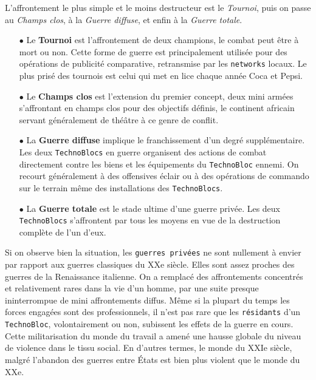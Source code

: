 \documentclass[11pt,twoside,a4paper]{article}
\begin{document}
\begin{multicols*}{2}
L'affrontement le plus simple et le moins destructeur est le \emph{Tournoi}, puis on passe au \emph{Champs clos}, {\`a} la \emph{Guerre diffuse}, et enfin {\`a} la \emph{Guerre totale}. %
\begin{itemize}
	\small
	\item[$\bullet$] Le \textbf{Tournoi} est l'affrontement de deux champions, le combat peut {\^e}tre {\`a} mort ou non. Cette forme de guerre est principalement utilis{\'e}e pour des op{\'e}rations de publicit{\'e} comparative, retransmise par les \texttt{networks} locaux. Le plus pris{\'e} des tournois est celui qui met en lice chaque ann{\'e}e Coca et Pepsi.
	\item[$\bullet$] Le \textbf{Champs clos} est l'extension du premier concept, deux mini arm{\'e}es s'affrontant en champs clos pour des objectifs d{\'e}finis, le continent africain servant g{\'e}n{\'e}ralement de th{\'e}{\^a}tre {\`a} ce genre de conflit.
	\item[$\bullet$] La \textbf{Guerre diffuse} implique le franchissement d'un degr{\'e} suppl{\'e}mentaire. Les deux \texttt{TechnoBlocs} en guerre organisent des actions de combat directement contre les biens et les {\'e}quipements du \texttt{TechnoBloc} ennemi. On recourt g{\'e}n{\'e}ralement {\`a} des offensives {\'e}clair ou {\`a} des op{\'e}rations de commando sur le terrain m{\^e}me des installations des \texttt{TechnoBlocs}.
	\item[$\bullet$] La \textbf{Guerre totale} est le stade ultime d'une guerre priv{\'e}e. Les deux \texttt{TechnoBlocs} s'affrontent par tous les moyens en vue de la destruction compl{\`e}te de l'un d'eux.
\end{itemize} %
	
Si on observe bien la situation, les \texttt{guerres priv{\'e}es} ne sont nullement {\`a} envier par rapport aux guerres classiques du XXe si{\`e}cle. Elles sont assez proches des guerres de la Renaissance italienne. On a remplac{\'e} des affrontements concentr{\'e}s et relativement rares dans la vie d'un homme, par une suite presque ininterrompue de mini affrontements diffus. M{\^e}me si la plupart du temps les forces engag{\'e}es sont des professionnels, il n'est pas rare que les \texttt{r{\'e}sidants} d'un \texttt{TechnoBloc}, volontairement ou non, subissent les effets de la guerre en cours. Cette militarisation du monde du travail a amen{\'e} une hausse globale du niveau de violence dans le tissu social. En d'autres termes, le monde du XXIe si{\`e}cle, malgr{\'e} l'abandon des guerres entre {\'E}tats est bien plus violent que le monde du XXe.~\\


\end{multicols*}
\end{document}
